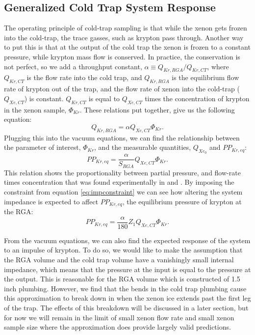 \documentclass[12pt]{article}
\begin{document}
\subsection{Generalized Cold Trap System Response}
\label{sec:response}
The operating principle of cold-trap sampling is that while the xenon gets frozen into the cold-trap, the trace gasses, such as krypton pass through. Another way to put this is that at the output of the cold trap the xenon is frozen to a constant pressure, while krypton mass flow is conserved. In practice, the conservation is not perfect, so we add a throughput constant, $\alpha \equiv Q_{Kr,RGA}/Q_{Kr,CT}$, where $Q_{Kr,CT}$ is the flow rate into the cold trap, and $Q_{Kr,RGA}$ is the equilibrium flow rate of krypton out of the trap, and the flow rate of xenon into the cold-trap ($Q_{Xe,CT}$) is constant. $Q_{Kr,CT}$ is equal to $Q_{Xe,CT}$ times the concentration of krypton in the xenon sample, $\Phi_{Kr}$. These relations put together, give us the following equation: 
\begin{equation}
Q_{Kr,RGA}=\alpha Q_{Xe,CT}\Phi_{Kr}.
\end{equation}
Plugging this into the vacuum equations, we can find the relationship between the parameter of interest, $\Phi_{Kr}$, and the measurable quantities, $Q_{Xe_0}$ and $PP_{Kr,eq}$:
\begin{equation}
\label{eq:krpres1}
PP_{Kr,eq}=\frac{\alpha}{S_{RGA}}Q_{Xe,CT}\Phi_{Kr}.
\end{equation}
This relation shows the proportionality between partial pressure, and flow-rate times concentration that was found experimentally in \cite{sampling_doug} and \cite{sampling_dm}. By imposing the constraint from equation \ref{eq:impconstraint} we can see how altering the system impedance is expected to affect $PP_{Kr,eq}$, the equilibrium pressure of krypton at the RGA:
\begin{equation}
\label{eq:krpres2}
PP_{Kr,eq}=\frac{\alpha}{180}Z_{1}Q_{Xe,CT}\Phi_{Kr}.
\end{equation}

From the vacuum equations, we can also find the expected response of the system to an impulse of krypton. To do so, we would like to make the assumption that the RGA volume and the cold trap volume have a vanishingly small internal impedance, which means that the pressure at the input is equal to the pressure at the output. This is reasonable for the RGA volume which is constructed of 1.5 inch plumbing. However, we find that the bends in the cold trap plumbing cause this approximation to break down in when the xenon ice extends past the first leg of the trap. The effects of this breakdown will be discussed in a later section, but for now we will remain in the limit of small xenon flow rate and small xenon sample size where the approximation does provide largely valid predictions.
\end{document}
